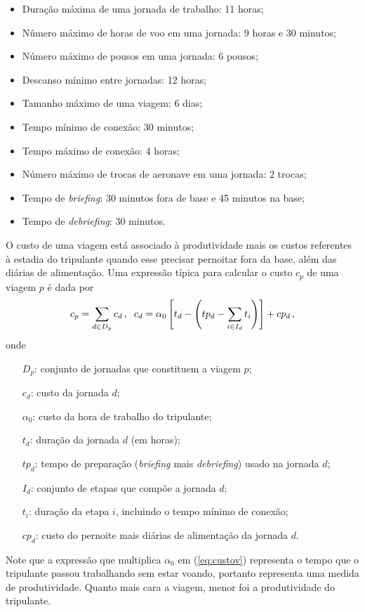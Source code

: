 \begin{itemize}
	\item Duração máxima de uma jornada de trabalho: 11 horas;
	\item Número máximo de horas de voo em uma jornada: 9 horas e 30 minutos;
	\item Número máximo de pousos em uma jornada: 6 pousos;
	\item Descanso mínimo entre jornadas: 12 horas;
	\item Tamanho máximo de uma viagem: 6 dias;
	\item Tempo mínimo de conexão: 30 minutos;
	\item Tempo máximo de conexão: 4 horas;
	\item Número máximo de trocas de aeronave em uma jornada: 2 trocas;
	\item Tempo de {\it briefing}: 30 minutos fora de base e 45 minutos na base;
	\item Tempo de {\it debriefing}: 30 minutos.
\end{itemize}

O custo de uma viagem está associado à produtividade mais os custos referentes à estadia do 
tripulante quando esse precisar pernoitar fora da base, além das diárias de alimentação. Uma 
expressão típica para calcular o custo $c_p$ de uma viagem $p$ é dada por
%
\begin{equation} \label{eq:custov} 
	c_p = \sum_{d \in D_p} c_d \, , \;\;
	c_d = \alpha_0 \left[t_d - \left(tp_d - \sum_{i \in I_d} t_i\right)\right] + cp_d \, ,
\end{equation} 
%
onde
%
\begin{itemize}
	\item[$D_p$:] conjunto de jornadas que constituem a viagem $p$;
	\item[$c_d$:] custo da jornada $d$;
	\item[$\alpha_0$:] custo da hora de trabalho do tripulante;
	\item[$t_d$:] duração da jornada $d$ (em horas);	
	\item[$tp_d$:] tempo de preparação ({\it briefing} mais {\it debriefing}) usado na jornada $d$;
	\item[$I_d$:] conjunto de etapas que compõe a jornada $d$;
	\item[$t_i$:] duração da etapa $i$, incluindo o tempo mínimo de conexão;
	\item[$cp_d$:] custo do pernoite mais diárias de alimentação da jornada $d$.
\end{itemize}
%
Note que a expressão que multiplica $\alpha_0$ em (\ref{eq:custov}) representa o tempo que o
tripulante passou trabalhando sem estar voando, portanto representa uma medida de produtividade.
Quanto mais cara a viagem, menor foi a produtividade do tripulante.

